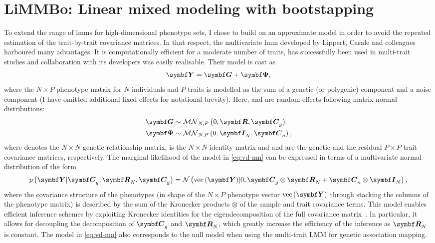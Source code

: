 \section{LiMMBo: Linear mixed modeling with bootstapping}
\label{section:intro-limmbo}
To extend the range of \glspl{lmm} for high-dimensional phenotype sets, I chose to build on an approximate model in order to avoid the repeated estimation of the trait-by-trait covariance matrices. In that respect, the multivariate \gls{lmm} developed by Lippert, Casale and colleagues \citep{Lippert2014,Casale2015} harboured many advantages. It is computationally efficient for a moderate number of traits, has successfully  been used in multi-trait studies \citep{Cannavo2016,Schor2017} and collaboration with its developers was easily realisable. 
Their model is cast as
\begin{equation}
\mat{Y} = \mat{G} + \mat{\Psi},
\label{eq:vd-mn}
\end{equation}
%
where the \(N \times P\) phenotype matrix  for \(N\) individuals and \(P\) traits is modelled as the sum of a genetic (or polygenic) component  and a noise component \tmat{\Psi} (I have omitted additional fixed effects for notational brevity). Here,  and \tmat{\Psi} are random effects following matrix normal distributions:
\begin{equation}
\begin{aligned}
\mat{G} &\sim\mathcal{MN}_{N, P}\left(0, \mat{R}, \matsub{C}{g}\right) \\
\mat{\Psi} &\sim\mathcal{MN}_{N, P}\left(0,  \matsub{I}{N}, \matsub{C}{n}\right),
\end{aligned}
\label{eq:mvn}
\end{equation}
%
where  denotes the \(N \times N\) genetic relationship matrix,  is the \(N \times N\) identity matrix and  and  are the genetic and the residual \(P \times P\) trait covariance matrices, respectively. The marginal likelihood of the model in \cref{eq:vd-mn} can be expressed in terms of a multivariate normal distribution of the form
\begin{equation}
p\left(\mat{Y} \rvert \matsub{C}{g},  \mat{R}_N, \matsub{C}{g}\right) = \mathcal{N}\left(\text{vec}\left(\mat{Y}\right) \rvert 0,\matsub{C}{g} \otimes \mat{R}_N + \matsub{C}{n} \otimes \matsub{I}{N}\right), 
\label{eq:vd}
\end{equation}
%
where the covariance structure of the phenotypes (in shape of the \(N \times P\) phenotype vector \(\text{vec}\left(\mat{Y}\right) \) through stacking the columns of the phenotype matrix) is described by the sum of the Kronecker products $\otimes$ of the sample and trait covariance terms. This model enables efficient inference schemes by exploiting Kronecker identities for the eigendecomposition of the full covariance matrix~\citep{Lippert2014,Rakitsch2013,Zhou2014,Casale2015}. 
In particular, it allows for decoupling the decomposition of $\matsub{C}{g}$ and $\mat{R}_N$, which greatly increase the efficiency of the inference as $\matsub{R}{N}$ is constant.
The model in \cref{eq:vd-mn} also corresponds to the null model when using the multi-trait LMM for genetic association mapping. 


